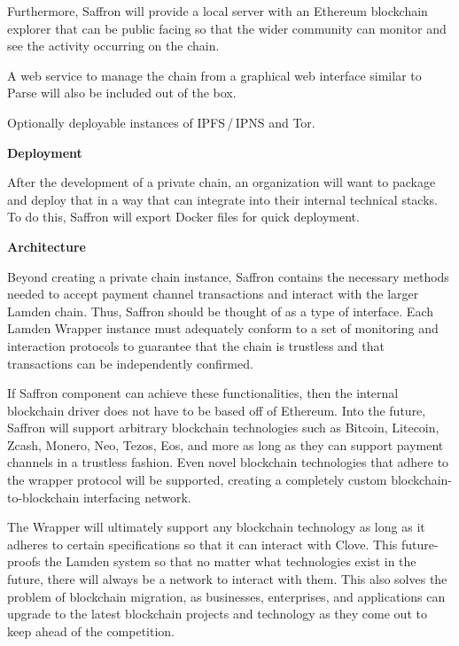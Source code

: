\documentclass{%
	article}
\begin{document}
Furthermore, Saffron will provide a local server with an Ethereum blockchain explorer that can be public facing so that the wider community can monitor and see the activity occurring on the chain.

A web service to manage the chain from a graphical web interface similar to Parse will also be included out of the box.

Optionally deployable instances of IPFS\,/\,IPNS and Tor.

\begin{center}
\textbf{Deployment}
\end{center}

After the development of a private chain, an organization will want to package and deploy that in a way that can integrate into their internal technical stacks. To do this, Saffron will export Docker files for quick deployment.

\begin{center}
\textbf{Architecture}
\end{center}

Beyond creating a private chain instance, Saffron contains the necessary methods needed to accept payment channel transactions and interact with the larger Lamden chain. Thus, Saffron should be thought of as a type of interface. Each Lamden Wrapper instance must adequately conform to a set of monitoring and interaction protocols to guarantee that the chain is trustless and that transactions can be independently confirmed.

If Saffron component can achieve these functionalities, then the internal blockchain driver does not have to be based off of Ethereum. Into the future, Saffron will support arbitrary blockchain technologies such as Bitcoin, Litecoin, Zcash, Monero, Neo, Tezos, Eos, and more as long as they can support payment channels in a trustless fashion. Even novel blockchain technologies that adhere to the wrapper protocol will be supported, creating a completely custom blockchain-to-blockchain interfacing network.

The Wrapper will ultimately support any blockchain technology as long as it adheres to certain specifications so that it can interact with Clove. This future-proofs the Lamden system so that no matter what technologies exist in the future, there will always be a network to interact with them. This also solves the problem of blockchain migration, as businesses, enterprises, and applications can upgrade to the latest blockchain projects and technology as they come out to keep ahead of the competition.
\end{document}
